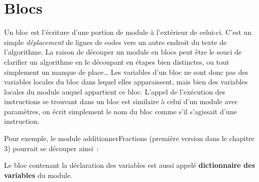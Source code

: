 \section{Blocs}

	{
	{Un bloc est l’écriture d’une portion de module
	à l’extérieur de celui-ci. C’est un simple
	}{\textit{déplacement}}{
	de lignes de codes vers un autre endroit du texte de
	l'algorithme. La raison de découper un module en blocs
	peut être le souci de clarifier un algorithme en le découpant en étapes
	bien distinctes, ou tout simplement un manque de place… Les variables
	d’un bloc ne sont donc pas des variables locales du bloc dans lequel
	elles apparaissent, mais bien des variables locales du module auquel
	appartient ce bloc. L’appel de l’exécution des instructions se trouvant
	dans un bloc est similaire à celui d’un module avec paramètres, on
	écrit simplement le nom du bloc comme s’il s’agissait d’une
	instruction.}}

	{
	Pour exemple, le module additionnerFractions (première version dans le
	chapitre 3) pourrait se découper ainsi~:}






	{
	{Le bloc contenant la déclaration des variables
	est aussi appelé }{\textbf{dictionnaire des
	variables}}{ du module.}}

